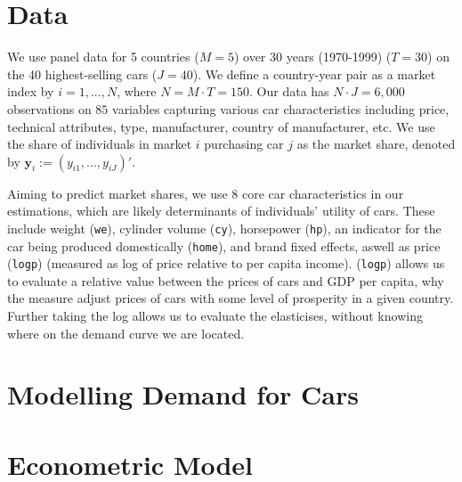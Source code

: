 \documentclass[11pt]{article}
\begin{document}

\section{Data}
We use panel data for 5 countries ($M=5$) over 30 years (1970-1999) ($T=30$) on the 40 highest-selling cars ($J=40$). We define a country-year pair as a market index by $i=1,...,N$, where $N=M\cdot T=150$. Our data has $N\cdot J=6,000$ observations on $85$ variables capturing various car characteristics including price, technical attributes, type, manufacturer, country of manufacturer, etc. We use the share of individuals in market $i$ purchasing car $j$ as the market share, denoted by $\mathbf{y}_i:=(y_{i1},...,y_{iJ})'$. 

Aiming to predict market shares, we use 8 core car characteristics in our estimations, which are likely determinants of individuals' utility of cars. These include weight (\texttt{we}), cylinder volume (\texttt{cy}), horsepower (\texttt{hp}), an indicator for the car being produced domestically (\texttt{home}), and brand fixed effects, aswell as price (\texttt{logp}) (measured as log of price relative to per capita income). (\texttt{logp}) allows us to evaluate a relative value between the prices of cars and GDP per capita, why the measure adjust prices of cars with some level of prosperity in a given country. Further taking the log allows us to evaluate the elasticises, without knowing where on the demand curve we are located.

\section{Modelling Demand for Cars}

\section{Econometric Model}
\end{document}
